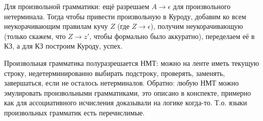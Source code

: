 	Для произвольной грамматики: ещё разрешаем $A \to \epsilon$ для произвольного нетерминала.
	Тогда чтобы привести произвольную в Куроду, добавим ко всем неукорачивающим правилам кучу $Z$
	(где $Z \to \epsilon$), получим неукорачивающую (только скажем, что $Z \to z'$, чтобы формально было аккуратно),
	переделаем её в КЗ, а для КЗ построим Куроду, успех.

	Произвольная грамматика полуразрешается НМТ: можно на ленте иметь текущую строку,
	недетерминированно выбирать подстроку, проверять, заменять, завершаться, если не осталось нетерминалов.
	Обратно: любую НМТ можно эмулировать произвольными грамматиками, это описано в конспекте, примерно как для ассоциативного исчисления доказывали на логике когда-то.
	Т.о. языки произвольных грамматик есть перечислимые.
